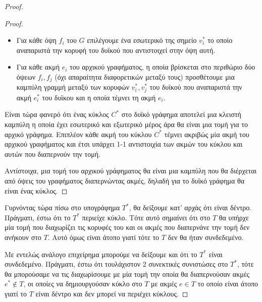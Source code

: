 \documentclass[a4paper, oneside, 11pt]{article}
\theoremstyle{definition}
\begin{document}
\begin{enumerate}
\begin{proof}
\begin{proof}
         \begin{itemize}
            \item Για κάθε όψη $f_i$ του $G$ επιλέγουμε ένα εσωτερικό της σημείο $v_i^*$ το οποίο αναπαριστά
                  την κορυφή του δυϊκού που αντιστοιχεί στην όψη αυτή.
         
            \item
                  Για κάθε ακμή $e_i$
                  του αρχικού γραφήματος, η οποία βρίσκεται στο περιθώριο δύο όψεων $f_i, f_j$
                  (όχι απαραίτητα διαφορετικών μεταξύ τους) προσθέτουμε μια καμπύλη γραμμή
                  μεταξύ των κορυφών $v_i^*, v_j^*$ του δυϊκού που αναπαριστά την ακμή $e_i^*$ του
                  δυϊκου και η οποία τέμνει τη ακμή $e_i$.
         \end{itemize}

         Είναι τώρα φανερό ότι ένας κύκλος $C^*$ στο δυϊκό γράφημα
         αποτελεί μια κλειστή καμπύλη η οποία έχει εσωτερικό και εξωτερικό μέρος άρα
         θα είναι μια τομή για το αρχικό γράφημα. Επιπλέον κάθε ακμή του κύκλου
         $C^*$ τέμνει ακριβώς μία ακμή του αρχικού γραφήματος και έτσι υπάρχει
         1-1 αντιστοιχία των ακμών του κύκλου και αυτών που διαπερνούν
         την τομή.

         Αντίστοιχα, μια τομή του αρχικού γράφηματος θα είναι μια καμπύλη που
         θα διέρχεται από όψεις του γραφήματος διαπερνώντας ακμές, δηλαδή για
         το δυϊκό γράφημα θα είναι ένας κύκλος.
      \end{proof}

      Γυρνόντας τώρα πίσω στο υπογράφημα $T^*$, θα δείξουμε κατ' αρχάς ότι
      είναι δέντρο. Πράγματι, έστω ότι το $T^*$ περιείχε κύκλο. Τότε αυτό
      σημαίνει ότι στο $T$ θα υπήρχε μία τομή που διαχωρίζει τις κορυφές
      του και οι ακμές που διαπερνάνε την τομή δεν ανήκουν στο $T$. Αυτό
      όμως είναι άτοπο γιατί τότε το $T$ δεν θα ήταν συνδεδεμένο.

      Με εντελώς ανάλογο επιχείρημα μπορούμε να δείξουμε και ότι το $T^*$
      είναι συνδεδεμένο. Πράγματι, έστω ότι τουλάχιστον 2 συνεκτικές συνιστώσες
      στο $T^*$, τότε θα μπορούσαμε να τις διαχωρίσουμε με μία τομή την οποία
      θα διαπερνούσαν ακμές $e^* \notin T$, οι οποίες να δημιουργούσαν
      κύκλο στο $T$ με ακμές $e \in T$ το οποίο είναι άτοπο γιατί το 
      $T$ είναι δέντρο και δεν μπορεί να περιέχει κύκλους.
   \end{proof}


\end{enumerate}
\end{document}

